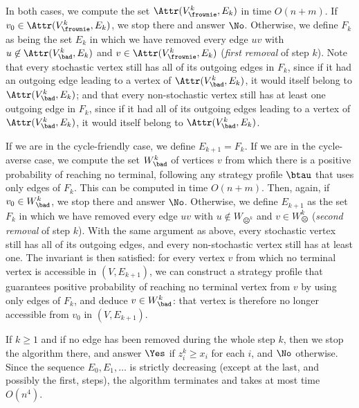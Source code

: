 \begin{itemize}
        In both cases, we compute the set $\Attr(V_{\frownie}^k, E_k)$ in time $O(n+m)$.
        If $v_0 \in \Attr(V_{\frownie}^k, E_k)$, we stop there and answer $\No$.
        Otherwise, we define $F_k$ as being the set $E_k$ in which we have removed every edge $uv$ with $u \not\in \Attr(V_\bad^k, E_k)$ and $v \in \Attr(V_{\frownie}^k, E_k)$ (\emph{first removal} of step $k$).
        Note that every stochastic vertex still has all of its outgoing edges in $F_k$, since if it had an outgoing edge leading to a vertex of $\Attr(V_\bad^k, E_k)$, it would itself belong to $\Attr(V_\bad^k, E_k)$; and that every non-stochastic vertex still has at least one outgoing edge in $F_k$, since if it had all of its outgoing edges leading to a vertex of $\Attr(V_\bad^k, E_k)$, it would itself belong to $\Attr(V_\bad^k, E_k)$.
        
        If we are in the cycle-friendly case, we define $E_{k+1} = F_k$.
        If we are in the cycle-averse case, we compute the set $W_\bad^k$ of vertices $v$ from which there is a positive probability of reaching no terminal, following any strategy profile $\btau$ that uses only edges of $F_k$. This can be computed in time $O(n+m)$. 
        Then, again, if $v_0 \in W_\bad^k$, we stop there and answer $\No$.
        Otherwise, we define $E_{k+1}$ as the set $F_k$ in which we have removed every edge $uv$ with $u \not\in W_{\frownie^k}$ and $v \in W_{\frownie}^k$ (\emph{second removal} of step $k$).
        With the same argument as above, every stochastic vertex still has all of its outgoing edges, and every non-stochastic vertex still has at least one.
        The invariant is then satisfied: for every vertex $v$ from which no terminal vertex is accessible in $(V, E_{k+1})$, we can construct a strategy profile that guarantees positive probability of reaching no terminal vertex from $v$ by using only edges of $F_k$, and deduce $v \in W_\bad^k$: that vertex is therefore no longer accessible from $v_0$ in $(V, E_{k+1})$.
        
        If $k \geq 1$ and if no edge has been removed during the whole step $k$, then we stop the algorithm there, and answer $\Yes$ if $z^k_i \geq x_i$ for each $i$, and $\No$ otherwise.
        Since the sequence $E_0, E_1, \dots$ is strictly decreasing (except at the last, and possibly the first, steps), the algorithm terminates and takes at most time $O(n^4)$.


\end{itemize}
